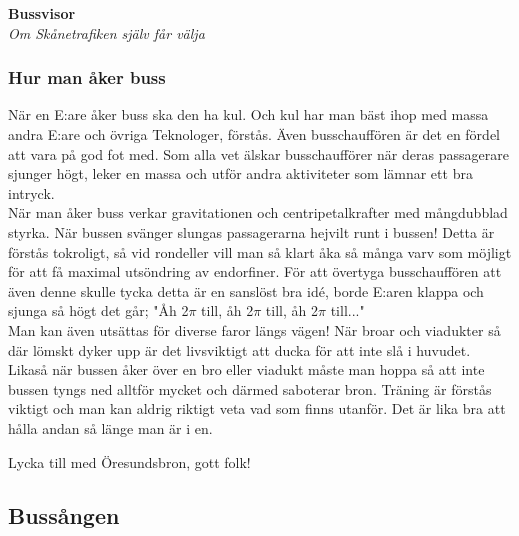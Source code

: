 \begin{center}
    \vspace*{1.5cm}
    {\fontsize{20}{20}\textbf{Bussvisor}}\\
    \vspace{0.7cm}
    {\fontsize{12}{12}\textit{Om Skånetrafiken själv får välja}}
\end{center}
\noBackground

\newpage
\resetBackground


\subsubsection*{Hur man åker buss}
När en E:are åker buss ska den ha kul. Och kul har man bäst ihop med 
massa andra E:are och övriga Teknologer, förstås. Även busschauffören 
är det en fördel att vara på god fot med. Som alla vet älskar busschaufförer 
när deras passagerare sjunger högt, leker en massa och utför andra aktiviteter 
som lämnar ett bra intryck.
\\

När man åker buss verkar gravitationen och centripetalkrafter med 
mångdubblad styrka. När bussen svänger slungas passagerarna hejvilt 
runt i bussen! Detta är förstås tokroligt, så vid rondeller vill man 
så klart åka så många varv som möjligt för att få maximal utsöndring 
av endorfiner. För att övertyga busschauffören att även denne skulle 
tycka detta är en sanslöst bra idé, borde E:aren klappa och sjunga så 
högt det går; "Åh 2$\pi$ till, åh 2$\pi$ till, åh 2$\pi$ till..."
\\

Man kan även utsättas för diverse faror längs vägen! När broar 
och viadukter så där lömskt dyker upp är det livsviktigt att ducka 
för att inte slå i huvudet. Likaså när bussen åker över en bro eller 
viadukt måste man hoppa så att inte bussen tyngs ned alltför mycket 
och därmed saboterar bron. Träning är förstås viktigt och man kan 
aldrig riktigt veta vad som finns utanför. Det är lika bra att hålla 
andan så länge man är i en.

Lycka till med Öresundsbron, gott folk!

\newpage

\subsection*{Bussången} 

